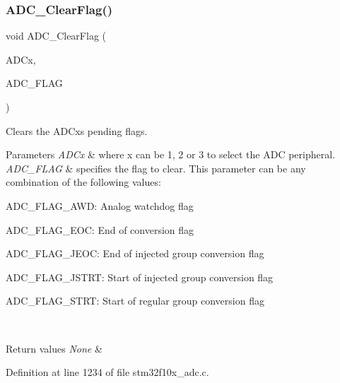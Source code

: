 \subsubsection{\texorpdfstring{A\+D\+C\+\_\+\+Clear\+Flag()}{ADC\_ClearFlag()}}
{\footnotesize\ttfamily void A\+D\+C\+\_\+\+Clear\+Flag (\begin{DoxyParamCaption}\item[{\hyperlink{struct_a_d_c___type_def}{A\+D\+C\+\_\+\+Type\+Def} $\ast$}]{A\+D\+Cx,  }\item[{uint8\+\_\+t}]{A\+D\+C\+\_\+\+F\+L\+AG }\end{DoxyParamCaption})}



Clears the A\+D\+Cx\textquotesingle{}s pending flags. 


\begin{DoxyParams}{Parameters}
{\em A\+D\+Cx} & where x can be 1, 2 or 3 to select the A\+DC peripheral. \\
\hline
{\em A\+D\+C\+\_\+\+F\+L\+AG} & specifies the flag to clear. This parameter can be any combination of the following values\+: \begin{DoxyItemize}
\item A\+D\+C\+\_\+\+F\+L\+A\+G\+\_\+\+A\+WD\+: Analog watchdog flag \item A\+D\+C\+\_\+\+F\+L\+A\+G\+\_\+\+E\+OC\+: End of conversion flag \item A\+D\+C\+\_\+\+F\+L\+A\+G\+\_\+\+J\+E\+OC\+: End of injected group conversion flag \item A\+D\+C\+\_\+\+F\+L\+A\+G\+\_\+\+J\+S\+T\+RT\+: Start of injected group conversion flag \item A\+D\+C\+\_\+\+F\+L\+A\+G\+\_\+\+S\+T\+RT\+: Start of regular group conversion flag \end{DoxyItemize}
\\
\hline
\end{DoxyParams}

\begin{DoxyRetVals}{Return values}
{\em None} & \\
\hline
\end{DoxyRetVals}


Definition at line 1234 of file stm32f10x\+\_\+adc.\+c.

\mbox{\label{group___a_d_c___exported___functions_ga601c6a67bd883eb631ecc7aa5e999b9c}} 
